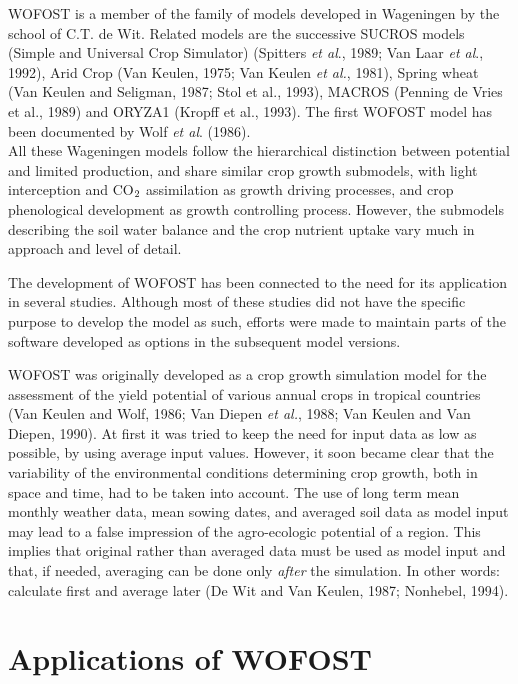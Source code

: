 \bigskip
WOFOST is a member of the family of models developed in {\nobreak}Wageningen by the school
of C.T. de Wit. Related models are the successive SUCROS models (Simple and
Universal Crop Simu\-lator) (Spitters {\it et al\/}., 1989; Van Laar {\it et al\/}., 1992), Arid Crop (Van
Keulen, 1975; Van Keulen {\it et al.\/}, 1981), Spring wheat (Van Keulen and Seligman, 1987;
Stol et al., 1993), MACROS (Penning de Vries et al., 1989) and ORYZA1 (Kropff et al.,
1993). The first WOFOST model has been documented by Wolf {\it et al\/}. (1986). \\
 All these Wageningen models follow the hierarchical distinc\-tion between potential and
limited production, and share similar crop growth submodels, with light interception and
CO$_{{\rm 2}}$ assimilation as growth driving processes, and crop {\nobreak}phenological development as
growth controlling process. How\-ever, the submodels describing the soil water balance and
the crop nutrient uptake vary much in approach and level of {\nobreak}detail.

\bigskip
The development of WOFOST has been connected to the need for its application in
several studies. Although most of these studies did not have the specific purpose to
develop the model as such, efforts were made to maintain parts of the software developed
as options in the subsequent model versions.

\bigskip
WOFOST was originally developed as a crop growth simulation model for the assessment
of the yield potential of various annual crops in tropi\-cal countries (Van Keulen and Wolf,
1986; Van Diepen {\it et al.\/}, 1988; Van Keulen and Van Diepen, 1990). At first it was tried
to keep the need for input data as low as possible, by using average input values.
However, it soon became clear that the variability of the environmental condi\-tions
determining crop growth, both in space and time, had to be taken into account. The use
of long term mean monthly weather data, mean sowing dates, and averaged soil data as
model input may lead to a false impression of the agro-{\nobreak}ecologic potential of a region.
This implies that original rather than averaged data must be used as model input and that,
if needed, averaging can be done only {\it after\/} the simula\-tion. In other words: calculate first
and average later (De Wit and Van Keulen, 1987; Nonhebel, 1994).

\bigskip
\bigskip

\section{Applications of WOFOST  }


